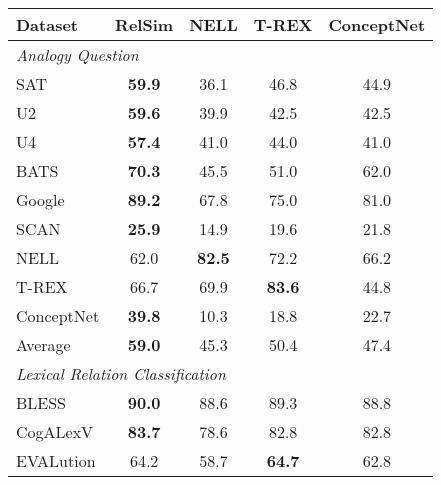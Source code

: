 \documentclass[3p]{elsarticle}
\begin{document}
{\begin{table}[!t]
\centering
\begin{tabular}{lcccc}\toprule
Dataset                      & RelSim       & NELL          & T-REX & ConceptNet \\ \midrule
\multicolumn{5}{l}{\textit{Analogy Question}}                                \\
SAT                       & \textbf{59.9}   & 36.1          & 46.8  & 44.9        \\
U2                        & \textbf{59.6}   & 39.9          & 42.5  & 42.5      \\
U4                        & \textbf{57.4}   & 41.0          & 44.0  & 41.0        \\
BATS                      & \textbf{70.3}   & 45.5          & 51.0  & 62.0       \\
Google                    & \textbf{89.2}   & 67.8          & 75.0  & 81.0        \\
SCAN                      & \textbf{25.9}   & 14.9          & 19.6  & 21.8        \\
NELL                      & 62.0            & \textbf{82.5} & 72.2  & 66.2        \\
T-REX                     & 66.7            & 69.9          & \textbf{83.6}  & 44.8        \\
ConceptNet                & \textbf{39.8}   & 10.3          & 18.8  & 22.7       \\\midrule
Average                   & \textbf{59.0}   & 45.3          & 50.4  & 47.4      \\\midrule
\multicolumn{5}{l}{\textit{Lexical Relation Classification}}                  \\
BLESS                     & \textbf{90.0}   & 88.6          & 89.3  & 88.8       \\
CogALexV                  & \textbf{83.7}   & 78.6          & 82.8  & 82.8        \\
EVALution                 & 64.2            & 58.7          & \textbf{64.7}  & 62.8      \\

\end{tabular}
\end{table}}
\end{document}
